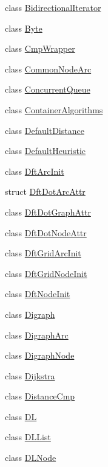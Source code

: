 \begin{DoxyCompactItemize}
\item 
class \hyperlink{class_designar_1_1_bidirectional_iterator}{Bidirectional\+Iterator}
\item 
class \hyperlink{class_designar_1_1_byte}{Byte}
\item 
class \hyperlink{class_designar_1_1_cmp_wrapper}{Cmp\+Wrapper}
\item 
class \hyperlink{class_designar_1_1_common_node_arc}{Common\+Node\+Arc}
\item 
class \hyperlink{class_designar_1_1_concurrent_queue}{Concurrent\+Queue}
\item 
class \hyperlink{class_designar_1_1_container_algorithms}{Container\+Algorithms}
\item 
class \hyperlink{class_designar_1_1_default_distance}{Default\+Distance}
\item 
class \hyperlink{class_designar_1_1_default_heuristic}{Default\+Heuristic}
\item 
class \hyperlink{class_designar_1_1_dft_arc_init}{Dft\+Arc\+Init}
\item 
struct \hyperlink{struct_designar_1_1_dft_dot_arc_attr}{Dft\+Dot\+Arc\+Attr}
\item 
class \hyperlink{class_designar_1_1_dft_dot_graph_attr}{Dft\+Dot\+Graph\+Attr}
\item 
class \hyperlink{class_designar_1_1_dft_dot_node_attr}{Dft\+Dot\+Node\+Attr}
\item 
class \hyperlink{class_designar_1_1_dft_grid_arc_init}{Dft\+Grid\+Arc\+Init}
\item 
class \hyperlink{class_designar_1_1_dft_grid_node_init}{Dft\+Grid\+Node\+Init}
\item 
class \hyperlink{class_designar_1_1_dft_node_init}{Dft\+Node\+Init}
\item 
class \hyperlink{class_designar_1_1_digraph}{Digraph}
\item 
class \hyperlink{class_designar_1_1_digraph_arc}{Digraph\+Arc}
\item 
class \hyperlink{class_designar_1_1_digraph_node}{Digraph\+Node}
\item 
class \hyperlink{class_designar_1_1_dijkstra}{Dijkstra}
\item 
class \hyperlink{class_designar_1_1_distance_cmp}{Distance\+Cmp}
\item 
class \hyperlink{class_designar_1_1_d_l}{DL}
\item 
class \hyperlink{class_designar_1_1_d_l_list}{D\+L\+List}
\item 
class \hyperlink{class_designar_1_1_d_l_node}{D\+L\+Node}

\end{DoxyCompactItemize}

